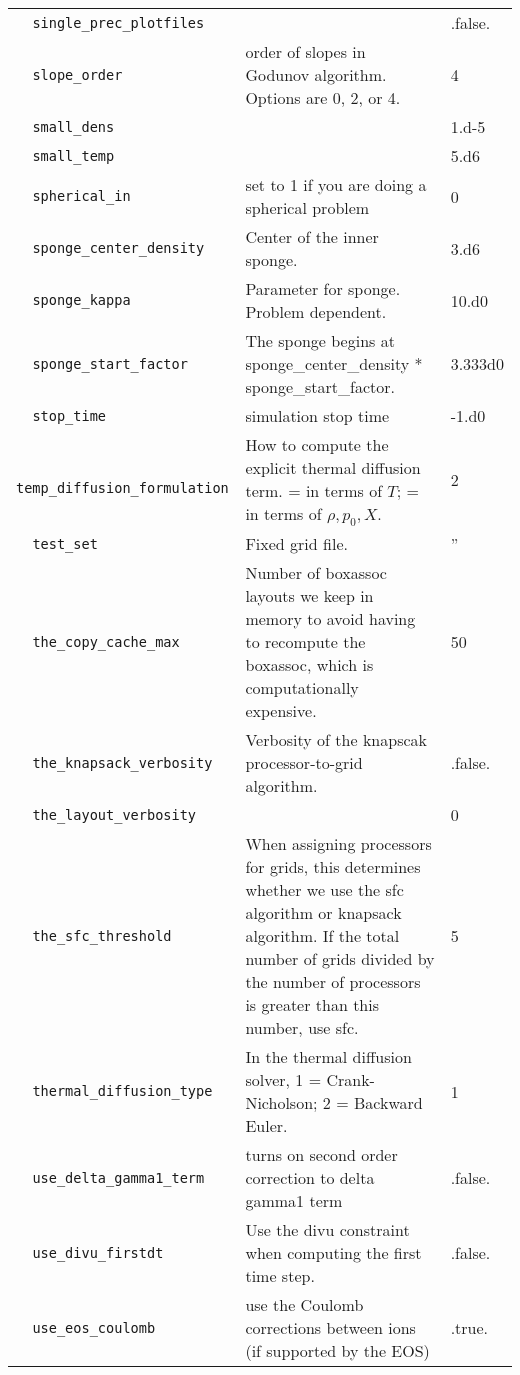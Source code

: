 {\begin{center}
\begin{longtable}{|l|p{3.25in}|l|}
\verb=  single_prec_plotfiles  = &    &  .false. \\
\verb=  slope_order  = &   order of slopes in Godunov algorithm.  Options are 0, 2, or 4.  &  4 \\
\verb=  small_dens  = &    &  1.d-5 \\
\verb=  small_temp  = &    &  5.d6 \\
\verb=  spherical_in  = &   set to 1 if you are doing a spherical problem  &  0 \\
\verb=  sponge_center_density  = &   Center of the inner sponge.  &  3.d6 \\
\verb=  sponge_kappa  = &   Parameter for sponge.  Problem dependent.  &  10.d0 \\
\verb=  sponge_start_factor  = &   The sponge begins at sponge\_center\_density * sponge\_start\_factor.  &  3.333d0 \\
\verb=  stop_time  = &   simulation stop time  &  -1.d0 \\
\verb=  temp_diffusion_formulation  = &   How to compute the explicit thermal diffusion term.  \newline 1 = in terms of $T$; \newline 2 = in terms of $\rho,p_0,X$.  &  2 \\
\verb=  test_set  = &   Fixed grid file.  &  '' \\
\verb=  the_copy_cache_max  = &    Number of boxassoc layouts we keep in memory to avoid having to recompute the boxassoc, which is computationally expensive.  &  50 \\
\verb=  the_knapsack_verbosity  = &   Verbosity of the knapscak processor-to-grid algorithm.  &  .false. \\
\verb=  the_layout_verbosity  = &    &  0 \\
\verb=  the_sfc_threshold  = &   When assigning processors for grids, this determines whether we use the sfc algorithm or knapsack algorithm.  If the total number of grids divided by the number of processors is greater than this number, use sfc.  &  5 \\
\verb=  thermal_diffusion_type  = &   In the thermal diffusion solver, 1 = Crank-Nicholson; 2 = Backward Euler.  &  1 \\
\verb=  use_delta_gamma1_term  = &   turns on second order correction to delta gamma1 term  &  .false. \\
\verb=  use_divu_firstdt  = &   Use the divu constraint when computing the first time step.  &  .false. \\
\verb=  use_eos_coulomb  = &   use the Coulomb corrections between ions (if supported by the EOS)  &  .true. \\

\end{longtable}
\end{center}}
